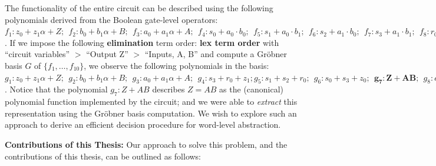 \begin{Example}
{The functionality of the entire circuit can be described using the
following polynomials derived from the Boolean gate-level operators: 
$f_1: z_0+z_1\alpha +Z; ~~f_2: b_0+b_1\alpha +B; ~~f_3: a_0+a_1 \alpha
+A; ~~f_4: s_0+a_0 \cdot b_0; ~~f_5: s_1+a_0 \cdot b_1; ~~f_6:
s_2+a_1 \cdot b_0; ~~f_7: s_3+a_1 \cdot b_1; ~~f_8: r_0+s_1 + s_2;
~~f_9: z_0+s_0 + s_3; ~~f_{10}: z_1 + r_0 + s_3$. If we impose the
following {\bf elimination} term order: {\bf lex term order} with
``circuit variables'' $>$ ``Output Z'' $>$ ``Inputs, A, B''
and compute a Gr\"obner basis $G$ of $\{f_1, \dots, f_{10}\}$, we observe
the following polynomials in the basis:  $g_1: z_0+z_1\alpha +Z;
~~g_2: b_0+b_1\alpha +B; ~~g_3: a_0+a_1 \alpha +A; ~~g_4: s_3+r_0+z_1;
g_5: s_1+s_2+r_0; ~~g_6: s_0+s_3+z_0; ~~{\mathbf{g_7: Z +  AB}}; ~~g_8:
a_1b_1+a_1B+b_1A+z_1; ~~g_9: r_0+a_1b_1+z_1; ~~g_{10}:
s_2+a_1b_0$. Notice that the polynomial $g_7: Z + AB$ describes $Z =
AB$ as the (canonical) polynomial function implemented by the circuit;
and we were able to {\it extract} this representation using the
Gr\"obner basis computation. We wish to explore such an approach to
derive an efficient decision procedure for word-level abstraction. 
}
\end{Example}

{\bf Contributions of this Thesis:} Our approach to solve this
problem, and the contributions of this thesis, can be outlined as
follows: 


